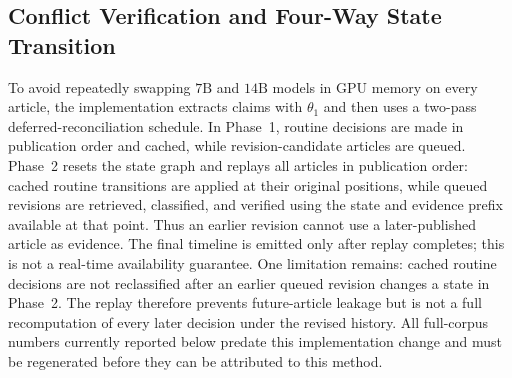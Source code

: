 \documentclass[journal]{IEEEtran}
\begin{document}
\subsection{Conflict Verification and Four-Way State Transition}
\label{subsec:verification}

To avoid repeatedly swapping $7\text{B}$ and $14\text{B}$ models in GPU memory on every article, the implementation extracts claims with $\theta_1$ and then uses a two-pass deferred-reconciliation schedule. In Phase~1, routine decisions are made in publication order and cached, while revision-candidate articles are queued. Phase~2 resets the state graph and replays all articles in publication order: cached routine transitions are applied at their original positions, while queued revisions are retrieved, classified, and verified using the state and evidence prefix available at that point. Thus an earlier revision cannot use a later-published article as evidence. The final timeline is emitted only after replay completes; this is not a real-time availability guarantee. One limitation remains: cached routine decisions are not reclassified after an earlier queued revision changes a state in Phase~2. The replay therefore prevents future-article leakage but is not a full recomputation of every later decision under the revised history. All full-corpus numbers currently reported below predate this implementation change and must be regenerated before they can be attributed to this method.
\end{document}
